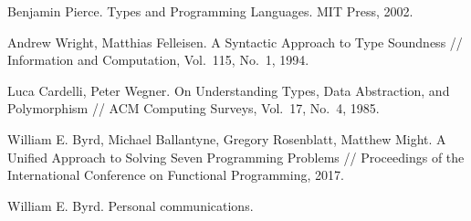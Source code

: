 \documentclass{llncs}
\begin{document}
\begin{thebibliography}{99}
Benjamin Pierce. Types and Programming Languages. MIT Press, 2002.

Andrew Wright, Matthias Felleisen. A Syntactic Approach to Type Soundness // Information and Computation, Vol.~115, No.~1, 1994.

Luca Cardelli, Peter Wegner. On Understanding Types, Data Abstraction, and Polymorphism // ACM Computing Surveys, Vol.~17, No.~4, 1985.

William E. Byrd, Michael Ballantyne, Gregory Rosenblatt, Matthew Might. A Unified Approach to Solving Seven Programming Problems // 
Proceedings of the International Conference on Functional Programming, 2017.

William E. Byrd. Personal communications.

\end{thebibliography}
\end{document}
